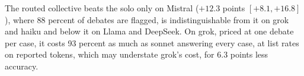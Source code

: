 The routed collective beats the solo only on Mistral ($+12.3$
points $[+8.1, +16.8]$), where 88 percent of debates are flagged, is
indistinguishable from it on grok and haiku and below it on Llama and
DeepSeek.
On grok, priced at one debate per case, it costs 93 percent as much as
sonnet answering every case, at list rates on reported tokens, which may
understate grok's cost, for 6.3 points less accuracy.
